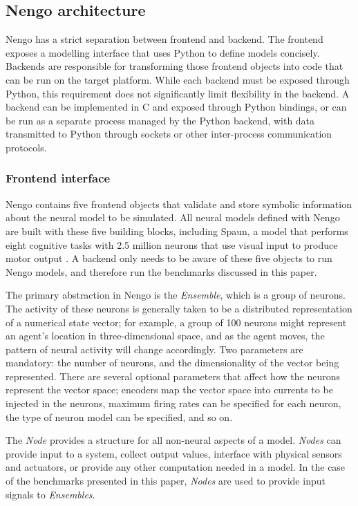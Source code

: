 \documentclass{frontiersSCNS}
\begin{document}
\subsection{Nengo architecture}

Nengo has a strict separation between
frontend and backend.
The frontend exposes a modelling interface
that uses Python to define models concisely.
Backends are responsible for transforming
those frontend objects into code that
can be run on the target platform.
While each backend must be exposed
through Python, this requirement
does not significantly limit
flexibility in the backend.
A backend can be implemented in C and exposed
through Python bindings,
or can be run as a separate process
managed by the Python backend,
with data transmitted to Python through sockets
or other inter-process communication protocols.

\subsubsection{Frontend interface}

Nengo contains five frontend objects
that validate and store symbolic information
about the neural model to be simulated.
All neural models defined with Nengo
are built with these five building blocks,
including Spaun, a model that performs
eight cognitive tasks with 2.5 million neurons
that use visual input to produce motor output
\citep{eliasmith2012}.
A backend only needs to be aware of these
five objects to run Nengo models,
and therefore run the benchmarks discussed in this paper.

The primary abstraction in Nengo is the \textit{Ensemble},
which is a group of neurons.
The activity of these neurons
is generally taken to be
a distributed representation
of a numerical state vector;
for example, a group of 100 neurons might represent
an agent's location in three-dimensional space,
and as the agent moves,
the pattern of neural activity
will change accordingly.
Two parameters are mandatory: the number of neurons,
and the dimensionality of the vector being represented.
There are several optional parameters that
affect how the neurons represent the vector space;
encoders map the vector space into currents
to be injected in the neurons,
maximum firing rates can be specified for each neuron,
the type of neuron model can be specified,
and so on.

The \textit{Node} provides a structure for all
non-neural aspects of a model.
\textit{Nodes} can provide input to a system,
collect output values,
interface with physical sensors and actuators,
or provide any other computation needed in a model.
In the case of the benchmarks presented in this paper,
\textit{Nodes} are used to provide input signals
to \textit{Ensembles}.
\end{document}
